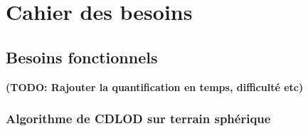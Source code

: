 \chapter{Cahier des besoins}\label{cahier-des-besoins}

\section{Besoins fonctionnels}\label{besoins-fonctionnels}

\textbf{(TODO: Rajouter la quantification en temps, difficulté etc)}

\subsection{Algorithme de CDLOD sur terrain sphérique}\label{algorithme-de-cdlod}


